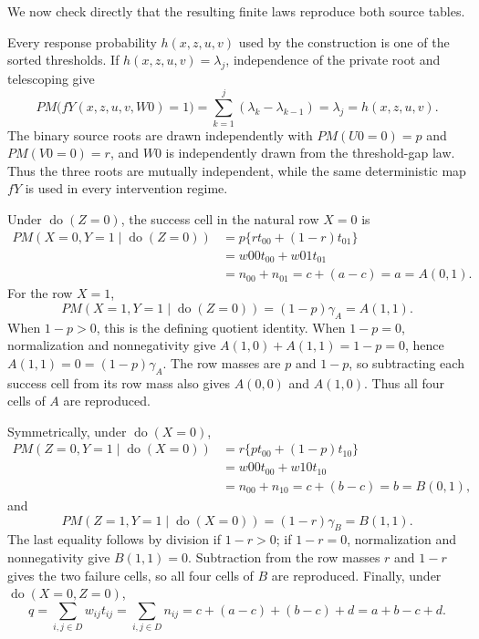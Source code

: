 We now check directly that the resulting finite laws reproduce both source tables.

Every response probability \(h(x,z,u,v)\) used by the construction is one of the sorted thresholds.  If \(h(x,z,u,v)=\lambda_j\), independence of the private root and telescoping give
\[
PM\bigl(fY(x,z,u,v,W0)=1\bigr)
=\sum_{k=1}^{j}(\lambda_k-\lambda_{k-1})
=\lambda_j
=h(x,z,u,v).
\]
The binary source roots are drawn independently with \(PM(U0=0)=p\) and \(PM(V0=0)=r\), and \(W0\) is independently drawn from the threshold-gap law.  Thus the three roots are mutually independent, while the same deterministic map \(fY\) is used in every intervention regime.

Under \(\operatorname{do}(Z=0)\), the success cell in the natural row \(X=0\) is
\[
\begin{aligned}
PM(X=0,Y=1\mid\operatorname{do}(Z=0))
&=p\{r t_{00}+(1-r)t_{01}\}\\
&=w00t_{00}+w01t_{01}\\
&=n_{00}+n_{01}=c+(a-c)=a=A(0,1).
\end{aligned}
\]
For the row \(X=1\),
\[
PM(X=1,Y=1\mid\operatorname{do}(Z=0))=(1-p)\gamma_A=A(1,1).
\]
When \(1-p>0\), this is the defining quotient identity.  When \(1-p=0\), normalization and nonnegativity give \(A(1,0)+A(1,1)=1-p=0\), hence \(A(1,1)=0=(1-p)\gamma_A\).  The row masses are \(p\) and \(1-p\), so subtracting each success cell from its row mass also gives \(A(0,0)\) and \(A(1,0)\).  Thus all four cells of \(A\) are reproduced.

Symmetrically, under \(\operatorname{do}(X=0)\),
\[
\begin{aligned}
PM(Z=0,Y=1\mid\operatorname{do}(X=0))
&=r\{p t_{00}+(1-p)t_{10}\}\\
&=w00t_{00}+w10t_{10}\\
&=n_{00}+n_{10}=c+(b-c)=b=B(0,1),
\end{aligned}
\]
and
\[
PM(Z=1,Y=1\mid\operatorname{do}(X=0))=(1-r)\gamma_B=B(1,1).
\]
The last equality follows by division if \(1-r>0\); if \(1-r=0\), normalization and nonnegativity give \(B(1,1)=0\).  Subtraction from the row masses \(r\) and \(1-r\) gives the two failure cells, so all four cells of \(B\) are reproduced.  Finally, under \(\operatorname{do}(X=0,Z=0)\),
\[
q=\sum_{i,j\in D}w_{ij}t_{ij}
=\sum_{i,j\in D}n_{ij}
=c+(a-c)+(b-c)+d
=a+b-c+d.
\]

